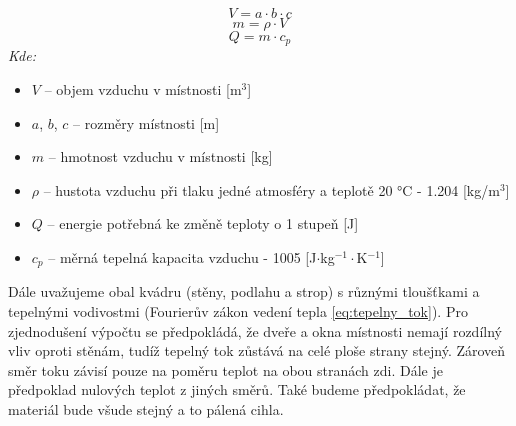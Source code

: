 \begin{equation}
    V = a \cdot b \cdot c
    \label{eq:objem}
\end{equation}
\begin{equation}
    m = \rho \cdot V
    \label{eq:hmotnost}
\end{equation}
\begin{equation}
    Q = m \cdot c_p
    \label{eq:energie}
\end{equation}
\noindent\textit{Kde:}
\begin{itemize}
    \item $V$ -- objem vzduchu v místnosti [m$^3$]
    \item $a$, $b$, $c$ -- rozměry místnosti [m]
    \item $m$ -- hmotnost vzduchu v místnosti [kg]
    \item $\rho$ -- hustota vzduchu při tlaku jedné atmosféry a teplotě 20 °C - 1.204 [kg/m$^3$]
    \item $Q$ -- energie potřebná ke změně teploty o 1 stupeň [J]
    \item $c_p$ -- měrná tepelná kapacita vzduchu - 1005 [J$\cdot$kg$^{-1}\cdot$K$^{-1}$] \newline
\end{itemize}
\noindent Dále uvažujeme obal kvádru (stěny, podlahu a strop) s různými tloušťkami a tepelnými vodivostmi (Fourierův zákon vedení tepla \ref{eq:tepelny_tok}). Pro zjednodušení výpočtu se předpokládá, že dveře a okna místnosti nemají rozdílný vliv oproti stěnám, tudíž tepelný tok zůstává na celé ploše strany stejný. Zároveň směr toku závisí pouze na poměru teplot na obou stranách zdi. Dále je předpoklad nulových teplot z jiných směrů. Také budeme předpokládat, že materiál bude všude stejný a to pálená cihla. 


